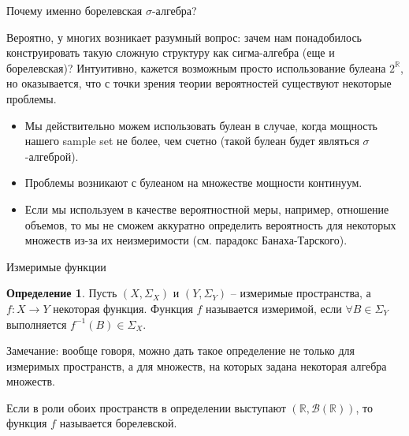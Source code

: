 \documentclass{beamer}%
\theoremstyle{definition}
\newtheorem{mydef}[theorem]{Определение}
\begin{document}
\begin{frame}{Почему именно борелевская $\sigma$-алгебра?}

Вероятно, у многих возникает разумный вопрос: зачем нам понадобилось конструировать такую сложную структуру как сигма-алгебра (еще и борелевская)? Интуитивно, кажется возможным просто использование булеана 
$2^{\mathbb{R}}$, но оказывается, что с точки зрения теории вероятностей существуют некоторые проблемы.

\begin{itemize}

    \item Мы действительно можем использовать булеан в случае, когда мощность нашего sample set не более, чем счетно (такой булеан будет являться $\sigma$-алгеброй). 
    
    \item Проблемы возникают с булеаном на множестве мощности континуум.
    
    \item Если мы используем в качестве вероятностной меры, например, отношение объемов, то мы не сможем аккуратно определить вероятность для некоторых множеств из-за их неизмеримости (см. парадокс Банаха-Тарского).
\end{itemize}

\end{frame}



\begin{frame}{Измеримые функции}
\begin{mydef}
    Пусть $(X, \Sigma_X)$ и $(Y, \Sigma_Y)$ -- измеримые пространства, а $f: X \rightarrow Y$ некоторая функция. Функция $f$ называется измеримой, если $\forall B \in \Sigma_Y$ выполняется $f^{-1}(B) \in \Sigma_X$.
\end{mydef}
Замечание: вообще говоря, можно дать такое определение не только для измеримых пространств, а для множеств, на которых задана некоторая алгебра множеств.

\;

Если в роли обоих пространств в определении выступают $(\mathbb{R}, \mathcal{B}(\mathbb{R}))$, то функция $f$ называется борелевской.
    
\end{frame}
\end{document}
